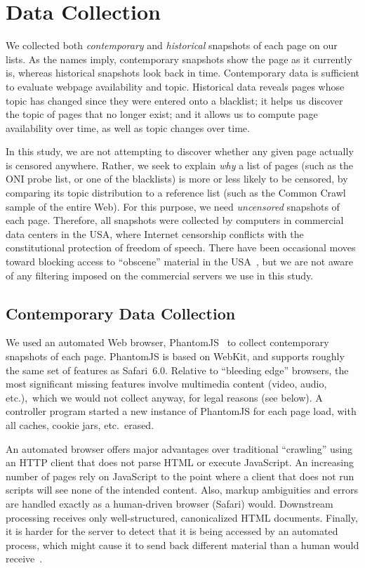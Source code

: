 \section{Data Collection}\label{s:collection}

We collected both \emph{contemporary} and \emph{historical} snapshots
of each page on our lists.  As the names imply, contemporary snapshots
show the page as it currently is, whereas historical snapshots look
back in time.  Contemporary data is sufficient to evaluate webpage
availability and topic.  Historical data reveals pages whose topic has
changed since they were entered onto a blacklist; it helps us discover
the topic of pages that no longer exist; and it allows us to compute
page availability over time, as well as topic changes over time.

In this study, we are not attempting to discover whether any given
page actually is censored anywhere.  Rather, we seek to explain
\emph{why} a list of pages (such as the ONI probe list, or one of the
blacklists) is more or less likely to be censored, by comparing its
topic distribution to a reference list (such as the Common Crawl
sample of the entire Web).  For this purpose, we need
\emph{uncensored} snapshots of each page.  Therefore, all snapshots
were collected by computers in commercial data centers in the USA,
where Internet censorship conflicts with the constitutional protection
of freedom of speech.  There have been occasional moves toward
blocking access to “obscene” material in the USA~\cite{oni.usa}, but
we are not aware of any filtering imposed on the commercial servers we
use in this study.

\subsection{Contemporary Data Collection}\label{s:collection_contemporary}

We used an automated Web browser, PhantomJS~\cite{phantomjs.nd} to
collect contemporary snapshots of each page.  PhantomJS is based on
WebKit, and supports roughly the same set of features as Safari~6.0.
Relative to “bleeding edge” browsers, the most significant missing
features involve multimedia content (video, audio, etc.),\ which we
would not collect anyway, for legal reasons (see below).  A controller
program started a new instance of PhantomJS for each page load, with
all caches, cookie jars, etc.\ erased.

An automated browser offers major advantages over traditional
“crawling” using an HTTP client that does not parse HTML or execute
JavaScript.  An increasing number of pages rely on JavaScript to the
point where a client that does not run scripts will see none of the
intended content. Also, markup ambiguities and errors are handled
exactly as a human-driven browser (Safari) would.  Downstream
processing receives only well-structured, canonicalized HTML
documents.  Finally, it is harder for the server to detect that it is
being accessed by an automated process, which might cause it to send
back different material than a human would
receive~\cite{wang2011cloak}.

